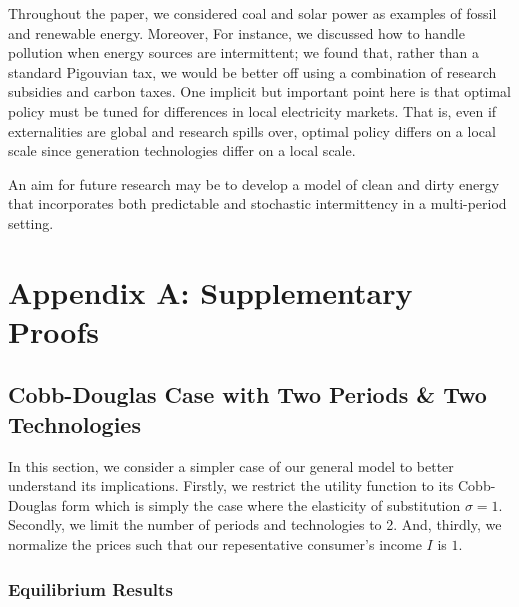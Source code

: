 \documentclass[11pt,a4paper]{extarticle}
\begin{document}
Throughout the paper, we considered coal and solar power as examples of fossil and renewable energy. Moreover, 
For instance, we discussed how to handle pollution when energy sources are intermittent; we found that, rather than a standard Pigouvian tax, we would be better off using a combination of research subsidies and carbon taxes. One implicit but important point here is that optimal policy must be tuned for differences in local electricity markets. That is, even if externalities are global and research spills over, optimal policy differs on a local scale since generation technologies differ on a local scale.  



An aim for future research may be to develop a model of clean and dirty energy that incorporates both predictable and stochastic intermittency in a multi-period setting. 



\pagebreak

\section{Appendix A: Supplementary Proofs}

\subsection{Cobb-Douglas Case with Two Periods \& Two Technologies}

In this section, we consider a simpler case of our general model to better understand its implications. Firstly, we restrict the utility function to its Cobb-Douglas form which is simply the case where the elasticity of substitution $\sigma = 1$. Secondly, we limit the number of periods and technologies to 2. And, thirdly, we normalize the prices such that our repesentative consumer's income $I$ is $1$.

\subsubsection{Equilibrium Results}
\end{document}
